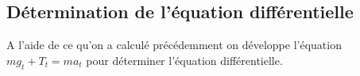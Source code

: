 \documentclass[10pt,a4paper]{article}
\begin{document}
\subsection{Détermination de l'équation différentielle}
A l'aide de ce qu'on a calculé précédemment on développe l'équation $mg_t+T_t=ma_t$ pour déterminer l'équation différentielle.
% 
%  
%  
% 
%
%
%
%
%  
%  
\end{document}
